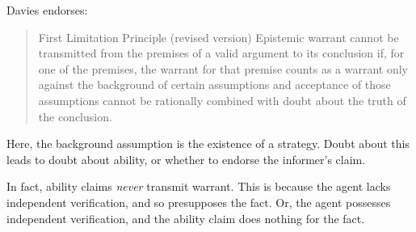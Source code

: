 \documentclass[10pt]{article}
\begin{document}
Davies endorses:
\begin{quote}
  First Limitation Principle (revised version) Epistemic warrant cannot be transmitted from the premises of a valid argument to its conclusion if, for one of the premises, the warrant for that premise counts as a warrant only against the background of certain assumptions and acceptance of those assumptions cannot be rationally combined with doubt about the truth of the conclusion.
\end{quote}
Here, the background assumption is the existence of a strategy.
Doubt about this leads to doubt about ability, or whether to endorse the informer's claim.

In fact, ability claims \emph{never} transmit warrant.
This is because the agent lacks independent verification, and so presupposes the fact.
Or, the agent possesses independent verification, and the ability claim does nothing for the fact.
\end{document}
